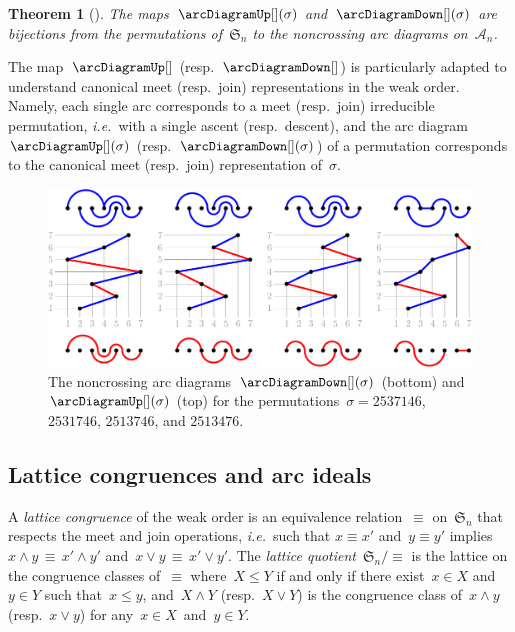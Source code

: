 \documentclass{amsart}
\newtheorem{theorem}{Theorem}[section]
\theoremstyle{definition}
\newcommand{\f}[1]{{\mathfrak{#1}}} %
\newcommand{\ie}{\textit{i.e.}~} %
\newcommand{\darkblue}{\color{darkblue}} %
\newcommand{\defn}[1]{\textsl{\darkblue #1}} %
\newcommand{\arcs}{{\mathcal{A}}} %
\newcommand{\meet}{\wedge} %
\newcommand{\join}{\vee} %
\begin{document}
\begin{theorem}[\cite{Reading-arcDiagrams}]
The maps~$\arcDiagramUp[](\sigma)$ and~$\arcDiagramDown[](\sigma)$ are bijections from the permutations of~$\f{S}_n$ to the noncrossing arc diagrams on~$\arcs_n$.
\end{theorem}

The map~$\arcDiagramUp[]$ (resp.~$\arcDiagramDown[]$) is particularly adapted to understand canonical meet (resp.~join) representations in the weak order.
Namely, each single arc corresponds to a meet (resp.~join) irreducible permutation, \ie with a single ascent (resp.~descent), and the arc diagram~$\arcDiagramUp[](\sigma)$ (resp.~$\arcDiagramDown[](\sigma)$) of a permutation corresponds to the canonical meet (resp.~join) representation of~$\sigma$.

\begin{figure}
	\capstart
	\centerline{\includegraphics[scale=.85]{arcDiagrams}}
	\caption{The noncrossing arc diagrams~$\arcDiagramDown[](\sigma)$ (bottom) and~$\arcDiagramUp[](\sigma)$ (top) for the permutations~$\sigma = 2537146$, $2531746$, $2513746$, and $2513476$. \cite[Fig.~2]{Pilaud-arcDiagramAlgebra}}
	\label{fig:noncrossingArcDiagrams}
\end{figure}


\subsection{Lattice congruences and arc ideals}
\label{subsec:latticeCongruencesArcIdeals}

A \defn{lattice congruence} of the weak order is an equivalence relation~$\equiv$ on~$\f{S}_n$ that respects the meet and join operations, \ie such that $x \equiv x'$ and~$y \equiv y'$ implies $x \meet y \, \equiv \, x' \meet y'$ and~$x \join y \, \equiv \, x' \join y'$.
The \defn{lattice quotient}~$\f{S}_n/{\equiv}$ is the lattice on the congruence classes of~$\equiv$ where~$X \le Y$ if and only if there exist~$x \in X$ and~$y \in Y$ such that~$x \le y$, and~$X \meet Y$ (resp.~$X \join Y$) is the congruence class of~$x \meet y$ (resp.~$x \join y$) for any~$x \in X$~and~$y \in Y$.
\end{document}
